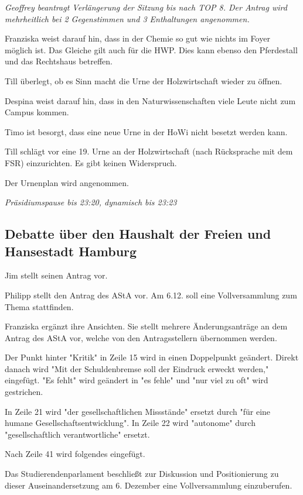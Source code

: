 \documentclass[ngerman,headheight=70pt]{scrartcl}
\begin{document}
    \textit{Geoffrey beantragt Verlängerung der Sitzung bis nach TOP 8. Der Antrag
    wird mehrheitlich bei 2 Gegenstimmen und 3 Enthaltungen angenommen.}

    Franziska weist darauf hin, dass in der Chemie so gut wie nichts im Foyer
    möglich ist. Das Gleiche gilt auch für die HWP. Dies kann ebenso den
    Pferdestall und das Rechtshaus betreffen.

    Till überlegt, ob es Sinn macht die Urne der Holzwirtschaft wieder zu öffnen.

    Despina weist darauf hin, dass in den Naturwissenschaften viele Leute nicht
    zum Campus kommen.

    Timo ist besorgt, dass eine neue Urne in der HoWi nicht besetzt werden kann.

    Till schlägt vor eine 19. Urne an der Holzwirtschaft (nach Rücksprache mit
    dem FSR) einzurichten. Es gibt keinen Widerspruch.

    Der Urnenplan wird angenommen.

    \textit{Präsidiumspause bis 23:20, dynamisch bis 23:23}

    \subsection{Debatte über den Haushalt der Freien und Hansestadt Hamburg}

    Jim stellt seinen Antrag vor.

    Philipp stellt den Antrag des AStA vor.
    Am 6.12. soll eine Vollversammlung zum Thema stattfinden.

    Franziska ergänzt ihre Ansichten. Sie stellt mehrere Änderungsanträge an dem
    Antrag des AStA vor, welche von den Antragsstellern übernommen werden.

    Der Punkt hinter "Kritik" in Zeile 15 wird in einen Doppelpunkt geändert.
    Direkt danach wird "Mit der Schuldenbremse soll der Eindruck erweckt werden,"
    eingefügt. "Es fehlt" wird geändert in "es fehle" und "nur viel zu oft"
    wird gestrichen.

    In Zeile 21 wird "der gesellschaftlichen Missstände" ersetzt durch "für eine
    humane Gesellschaftsentwicklung". In Zeile 22 wird "autonome" durch
    "gesellschaftlich verantwortliche" ersetzt.

    Nach Zeile 41 wird folgendes eingefügt.

    \begin{blockquote}
        Das Studierendenparlament beschließt zur Diskussion und Positionierung
        zu dieser Auseinandersetzung am 6. Dezember eine Vollversammlung
        einzuberufen.
    \end{blockquote}
\end{document}
